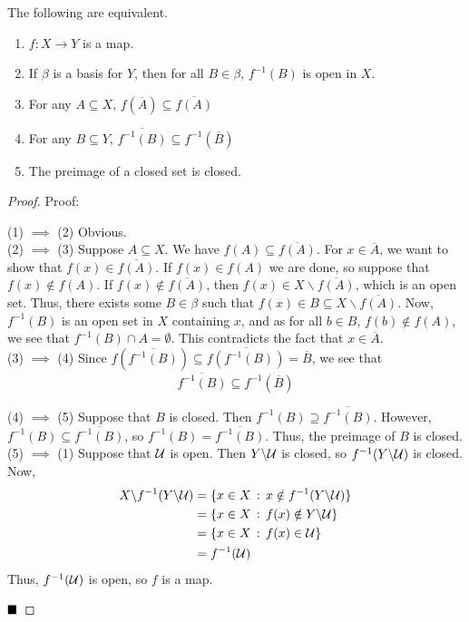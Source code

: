 \begin{lemma}
    The following are equivalent.
    \begin{enumerate}
        \item $f : X \to Y$ is a map.
        \item If $\beta$ is a basis for $Y$, then for all $B \in \beta$, $f^{-1}(B)$ is open in $X$.
        \item For any $A \subseteq X$, $f(\overline{A}) \subseteq \overline{f(A)}$
        \item For any $B \subseteq Y$, $\overline{f^{-1}(B)} \subseteq f^{-1}(\overline{B})$
        \item The preimage of a closed set is closed. 
    \end{enumerate}
\end{lemma}
\begin{proof}{Proof:}

    (1) $\implies$ (2) Obvious.\\

    (2) $\implies$ (3) Suppose $A \subseteq X$. We have $f(A) \subseteq \overline{f(A)}$. For $x \in \overline{A}$, we want to show that $f(x) \in \overline{f(A)}$. If $f(x) \in f(A)$ we are done, so suppose that $f(x) \notin f(A)$. If $f(x) \notin \overline{f(A)}$, then $f(x) \in X \backslash \overline{f(A)}$, which is an open set. Thus, there exists some $B \in \beta$ such that $f(x) \in B \subseteq X \backslash \overline{f(A)}$. Now, $f^{-1}(B)$ is an open set in $X$ containing $x$, and as for all $b \in B$, $f(b) \notin f(A)$, we see that $f^{-1}(B) \cap A = \emptyset$. This contradicts the fact that $x \in \overline{A}$.\\

    (3) $\implies$ (4) Since $f(\overline{f^{-1}(B)}) \subseteq \overline{f(f^{-1}(B))} = \overline{B}$, we see that
    \[ \overline{f^{-1}(B)} \subseteq f^{-1}(\overline{B}) \]

    (4) $\implies$ (5) Suppose that $B$ is closed. Then $f^{-1}(B) \supseteq \overline{f^{-1}(B)}$. However, $f^{-1}(B) \subseteq \overline{f^{-1}(B)}$, so $f^{-1}(B) = \overline{f^{-1}(B)}$. Thus, the preimage of $B$ is closed.\\

    (5) $\implies$ (1) Suppose that $\cal{U}$ is open. Then $Y \backslash \cal{U}$ is closed, so $f^{-1}(Y \backslash \cal{U})$ is closed. Now, 
    \begin{align*}
        X \backslash f^{-1}(Y \backslash \cal{U}) &= \{x \in X \col x \notin f^{-1}(Y \backslash \cal{U})\}\\
        &= \{x \in X \col f(x) \notin Y \backslash \cal{U}\}\\
        &= \{x \in X \col f(x) \in \cal{U}\}\\
        &= f^{-1}(\cal{U})
    \end{align*}
    Thus, $f^{-1}(\cal{U})$ is open, so $f$ is a map.

    $\qed$
\end{proof}
